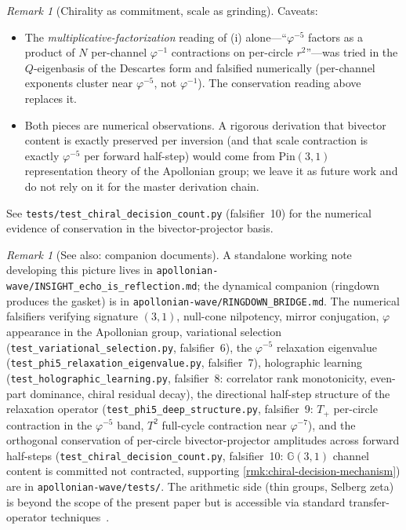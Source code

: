 \documentclass[11pt,a4paper]{article}
\theoremstyle{plain}
\theoremstyle{definition}
\theoremstyle{remark}
\newtheorem{remark}[theorem]{Remark}
\numberwithin{equation}{section}
\newcommand{\Cl}{\mathbb{G}}
\newcommand{\vp}{\varphi}
\begin{document}
\begin{remark}[Chirality as commitment, scale as grinding]
Caveats:
\begin{itemize}
\item[(a)] The \emph{multiplicative-factorization} reading of (i)
  alone---``\(\vp^{-5}\) factors as a product of \(N\) per-channel
  \(\vp^{-1}\) contractions on per-circle \(r^{2}\)''---was tried in
  the \(Q\)-eigenbasis of the Descartes form and falsified
  numerically (per-channel exponents cluster near \(\vp^{-5}\), not
  \(\vp^{-1}\)).  The conservation reading above replaces it.
\item[(b)] Both pieces are numerical observations.  A rigorous
  derivation that bivector content is exactly preserved per
  inversion (and that scale contraction is exactly \(\vp^{-5}\) per
  forward half-step) would come from Pin\((3,1)\) representation
  theory of the Apollonian group; we leave it as future work and do
  not rely on it for the master derivation chain.
\end{itemize}
See \texttt{tests/test\_chiral\_decision\_count.py} (falsifier~10)
for the numerical evidence of conservation in the bivector-projector
basis.
\end{remark}

\begin{remark}[See also: companion documents]
\label{rmk:see-also-companion-docs}
A standalone working note developing this picture lives in
\texttt{apollonian-wave/INSIGHT\_echo\_is\_reflection.md}; the dynamical
companion (ringdown produces the gasket) is in
\texttt{apollonian-wave/RINGDOWN\_BRIDGE.md}.
The numerical falsifiers verifying signature \((3,1)\), null-cone
nilpotency, mirror conjugation, \(\vp\) appearance in the Apollonian
group, variational selection (\texttt{test\_variational\_selection.py},
falsifier~6), the \(\vp^{-5}\) relaxation eigenvalue
(\texttt{test\_phi5\_relaxation\_eigenvalue.py}, falsifier~7),
holographic learning (\texttt{test\_holographic\_learning.py},
falsifier~8: correlator rank monotonicity, even-part dominance, chiral
residual decay), the directional half-step structure of the
relaxation operator (\texttt{test\_phi5\_deep\_structure.py},
falsifier~9: \(T_{+}\) per-circle contraction in the \(\vp^{-5}\) band,
\(T^{2}\) full-cycle contraction near \(\vp^{-7}\)), and the
orthogonal conservation of per-circle bivector-projector amplitudes
across forward half-steps (\texttt{test\_chiral\_decision\_count.py},
falsifier~10: \(\Cl(3,1)\) channel content is committed not
contracted, supporting \cref{rmk:chiral-decision-mechanism}) are in
\texttt{apollonian-wave/tests/}.  The arithmetic side (thin groups,
Selberg zeta) is beyond the scope of the present paper but is
accessible via standard transfer-operator
techniques~\cite{mayer1991,pollicott-sharp,bourgain2010,kontorovich-oh}.
\end{remark}
\end{document}
